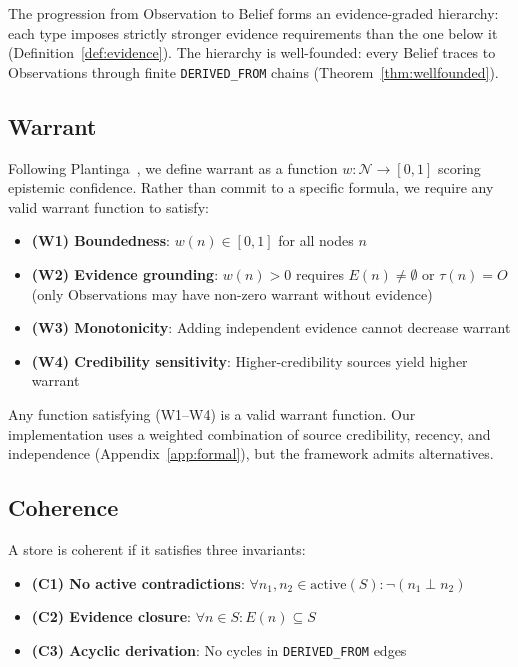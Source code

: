 \documentclass[11pt,letterpaper]{article}
\begin{document}
The progression from Observation to Belief forms an evidence-graded hierarchy: each type imposes strictly stronger evidence requirements than the one below it (Definition~\ref{def:evidence}). The hierarchy is well-founded: every Belief traces to Observations through finite \texttt{DERIVED\_FROM} chains (Theorem~\ref{thm:wellfounded}).

\subsection{Warrant}

Following Plantinga~\cite{plantinga1993}, we define warrant as a function $w: \mathcal{N} \to [0,1]$ scoring epistemic confidence. Rather than commit to a specific formula, we require any valid warrant function to satisfy:

\begin{itemize}[noitemsep]
    \item \textbf{(W1) Boundedness}: $w(n) \in [0,1]$ for all nodes $n$
    \item \textbf{(W2) Evidence grounding}: $w(n) > 0$ requires $E(n) \neq \emptyset$ or $\tau(n) = O$ (only Observations may have non-zero warrant without evidence)
    \item \textbf{(W3) Monotonicity}: Adding independent evidence cannot decrease warrant
    \item \textbf{(W4) Credibility sensitivity}: Higher-credibility sources yield higher warrant
\end{itemize}

Any function satisfying (W1--W4) is a valid warrant function. Our implementation uses a weighted combination of source credibility, recency, and independence (Appendix~\ref{app:formal}), but the framework admits alternatives.

\clearpage

\subsection{Coherence}

A store is coherent if it satisfies three invariants:

\begin{itemize}[noitemsep]
    \item \textbf{(C1) No active contradictions}: $\forall n_1, n_2 \in \text{active}(S): \neg(n_1 \perp n_2)$
    \item \textbf{(C2) Evidence closure}: $\forall n \in S: E(n) \subseteq S$
    \item \textbf{(C3) Acyclic derivation}: No cycles in \texttt{DERIVED\_FROM} edges
\end{itemize}
\end{document}
